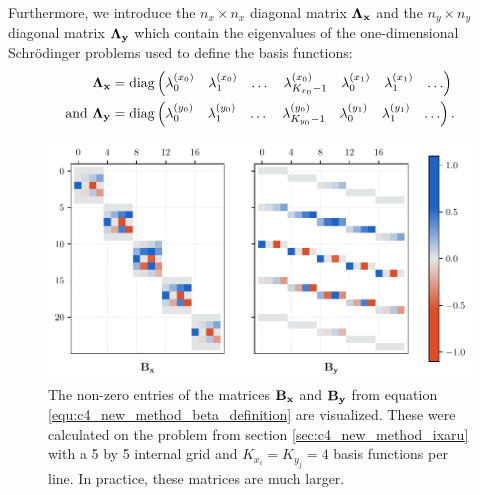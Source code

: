 Furthermore, we introduce the $n_x \times n_x$ diagonal matrix $\vb{\Lambda_x}$ and the $n_y \times n_y$ diagonal matrix $\vb{\Lambda_y}$ which contain the eigenvalues of the one-dimensional Schrödinger problems used to define the basis functions:
\begin{align*}
    \vb{\Lambda_x}            & = \operatorname{diag}\begin{pmatrix} \lambda_0^{(x_0)} & \lambda_1^{(x_0)} & \dots & \lambda_{K_{x_0}-1}^{(x_0)} & \lambda_0^{(x_1)} & \lambda_1^{(x_1)} & \dots \end{pmatrix}         \\
    \text{and }\vb{\Lambda_y} & = \operatorname{diag}\begin{pmatrix} \lambda_0^{(y_0)} & \lambda_1^{(y_0)} & \dots & \lambda_{K_{y_0}-1}^{(y_0)} & \lambda_0^{(y_1)} & \lambda_1^{(y_1)} & \dots \end{pmatrix}\text{.} \\
\end{align*}

\begin{figure}
    \begin{center}
        \includegraphics[width=\textwidth]{img/chapter4/new_method_beta.pdf}
        \caption{The non-zero entries of the matrices $\vb{B_x}$ and $\vb{B_y}$ from equation \eqref{equ:c4_new_method_beta_definition} are visualized. These were calculated on the problem from section \ref{sec:c4_new_method_ixaru} with a 5 by 5 internal grid and $K_{x_i} = K_{y_j} = 4$ basis functions per line. In practice, these matrices are much larger.}
        \label{fig:c4_new_method_beta}
    \end{center}
\end{figure}


